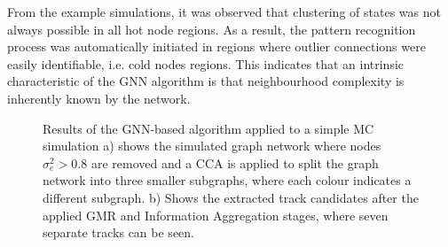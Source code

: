 From the example simulations, it was observed that clustering of states was not always possible in all hot node regions. As a result, the pattern recognition process was automatically initiated in regions where outlier connections were easily identifiable, i.e. cold nodes regions. This indicates that an intrinsic characteristic of the GNN algorithm is that neighbourhood complexity is inherently known by the network. 

\begin{center}
\begin{figure}[htbp!]%
    \centering
    \hfill
    \caption{Results of the GNN-based algorithm applied to a simple MC simulation a) shows the simulated graph network where nodes $\sigma_e^2 > 0.8$ are removed and a CCA is applied to split the graph network into three smaller subgraphs, where each colour indicates a different subgraph. b) Shows the extracted track candidates after the applied GMR and Information Aggregation stages, where seven separate tracks can be seen.}%
    \label{fig:example-application-1}%
\end{figure}
\end{center}

